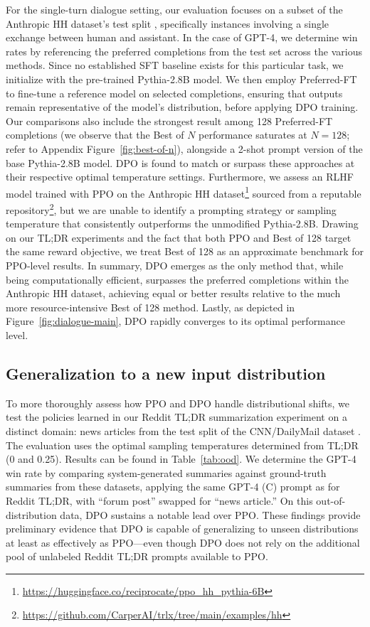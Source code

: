 For the single-turn dialogue setting, our evaluation focuses on a subset of the Anthropic HH dataset's test split \citep{bai2022training}, specifically instances involving a single exchange between human and assistant. In the case of GPT-4, we determine win rates by referencing the preferred completions from the test set across the various methods. Since no established SFT baseline exists for this particular task, we initialize with the pre-trained Pythia-2.8B model. We then employ Preferred-FT to fine-tune a reference model on selected completions, ensuring that outputs remain representative of the model's distribution, before applying DPO training. Our comparisons also include the strongest result among 128 Preferred-FT completions (we observe that the Best of $N$ performance saturates at $N=128$; refer to Appendix Figure~\ref{fig:best-of-n}), alongside a 2-shot prompt version of the base Pythia-2.8B model. DPO is found to match or surpass these approaches at their respective optimal temperature settings. Furthermore, we assess an RLHF model trained with PPO on the Anthropic HH dataset\footnote{\url{https://huggingface.co/reciprocate/ppo_hh_pythia-6B}} sourced from a reputable repository\footnote{\url{https://github.com/CarperAI/trlx/tree/main/examples/hh}}, but we are unable to identify a prompting strategy or sampling temperature that consistently outperforms the unmodified Pythia-2.8B. Drawing on our TL;DR experiments and the fact that both PPO and Best of 128 target the same reward objective, we treat Best of 128 as an approximate benchmark for PPO-level results. In summary, DPO emerges as the only method that, while being computationally efficient, surpasses the preferred completions within the Anthropic HH dataset, achieving equal or better results relative to the much more resource-intensive Best of 128 method. Lastly, as depicted in Figure~\ref{fig:dialogue-main}, DPO rapidly converges to its optimal performance level.

\subsection{Generalization to a new input distribution}

To more thoroughly assess how PPO and DPO handle distributional shifts, we test the policies learned in our Reddit TL;DR summarization experiment on a distinct domain: news articles from the test split of the CNN/DailyMail dataset \citep{nallapati-etal-2016-abstractive}. The evaluation uses the optimal sampling temperatures determined from TL;DR (0 and 0.25). Results can be found in Table~\ref{tab:ood}. We determine the GPT-4 win rate by comparing system-generated summaries against ground-truth summaries from these datasets, applying the same GPT-4 (C) prompt as for Reddit TL;DR, with “forum post” swapped for “news article.” On this out-of-distribution data, DPO sustains a notable lead over PPO. These findings provide preliminary evidence that DPO is capable of generalizing to unseen distributions at least as effectively as PPO—even though DPO does not rely on the additional pool of unlabeled Reddit TL;DR prompts available to PPO.

